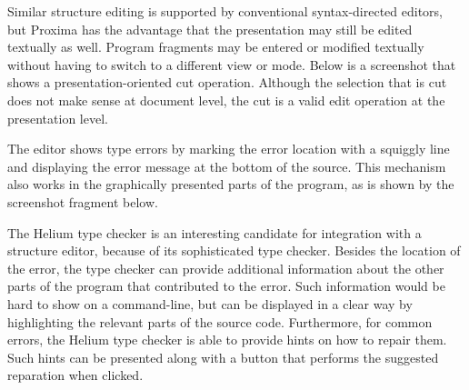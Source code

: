  
 

Similar structure editing is supported by conventional syntax-directed editors, but Proxima has the advantage that the presentation may still be edited textually as well. Program fragments may be entered or modified textually without having to switch to a different view or mode.  Below is a screenshot that shows a presentation-oriented cut operation. Although the selection that is cut does not make sense at document level, the cut is a valid edit operation at the presentation level.

\begin{center}
 \qquad
{}
\end{center}

\bc
\begin{center}
\end{center}
\ec


The editor shows type errors by marking the error location with a squiggly line and displaying the error message at the bottom of the source. This mechanism also works in the graphically presented parts of the program, as is shown by the screenshot fragment below.

\begin{center}
\end{center}

The Helium type checker is an interesting candidate for integration with a structure editor, because of its sophisticated type checker. Besides the location of the error, the type checker can provide additional information about the other parts of the program that contributed to the error. Such information would be hard to show on a command-line, but can be displayed in a clear way by highlighting the relevant parts of the source code. Furthermore, for common errors, the Helium type checker is able to provide hints on how to repair them. Such hints can be presented along with a button that performs the suggested reparation when clicked.


